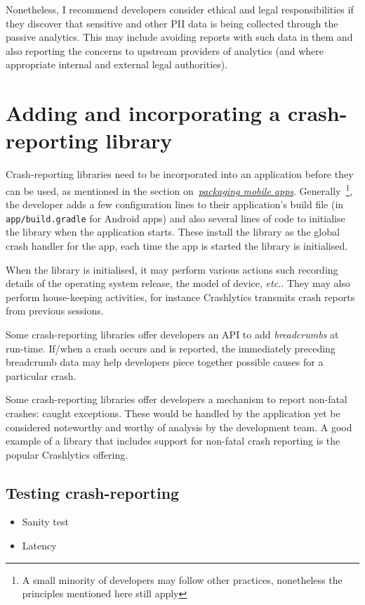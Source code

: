Nonetheless, I recommend developers consider ethical and legal responsibilities if they discover that sensitive and other PII data is being collected through the passive analytics. This may include avoiding reports with such data in them and also reporting the concerns to upstream providers of analytics (and where appropriate internal and external legal authorities).

\section{Adding and incorporating a crash-reporting library}
Crash-reporting libraries need to be incorporated into an application before they can be used, as mentioned in the section on~\href{section-packaging-mobile-apps}{\emph{packaging mobile apps}}. Generally~\footnote{A small minority of developers may follow other practices, nonetheless the principles mentioned here still apply}, the developer adds a few configuration lines to their application's build file (in \texttt{app/build.gradle} for Android apps) and also several lines of code to initialise the library when the application starts. These install the library as the global crash handler for the app, each time the app is started the library is initialised. 

When the library is initialised, it may perform various actions such recording details of the operating system release, the model of device, \emph{etc.}. They may also perform house-keeping activities, for instance Crashlytics transmits crash reports from previous sessions.

Some crash-reporting libraries offer developers an API to add \emph{breadcrumbs} at run-time. If/when a crash occurs and is reported, the immediately preceding breadcrumb data may help developers piece together possible causes for a particular crash.

Some crash-reporting libraries offer developers a mechanism to report non-fatal crashes: caught exceptions. These would be handled by the application yet be considered noteworthy and worthy of analysis by the development team. A good example of a library that includes support for non-fatal crash reporting is the popular Crashlytics offering.  

\subsection{Testing crash-reporting}
\begin{itemize}
    \item Sanity test
    \item Latency
\end{itemize}

